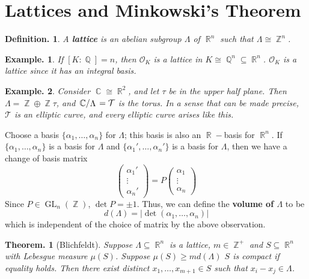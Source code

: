 \documentclass[11pt, a4paper]{memoir}
\DeclareMathOperator{\Q}{{\mathbb{Q}}}
\DeclareMathOperator{\Z}{{\mathbb{Z}}}
\DeclareMathOperator{\R}{{\mathbb{R}}}
\DeclareMathOperator{\C}{{\mathbb{C}}}
\theoremstyle{change}
\newtheorem{theorem}{Theorem.}[section]
\theoremstyle{plain}
\theoremstyle{nonumberplain}
\newtheorem{definition}{Definition.}
\newtheorem{example}{Example.}
\DeclareMathOperator{\GL}{GL}
\newcommand{\quot}[2]{\mathchoice{\left.\raisebox{0.13em}{$#1$}\middle/\raisebox{-0.13em}{$#2$}\right.}
                                 {\left.\raisebox{0.07em}{$#1$}\middle/\raisebox{-0.07em}{$#2$}\right.}
                                 {\left.\raisebox{0.03em}{$#1$}\middle/\raisebox{-0.03em}{$#2$}\right.}
                                 {\left.\raisebox{0em}{$#1$}\middle/\raisebox{0em}{$#2$}\right.}}
\newcommand{\mbf}[1]{{\boldmath\bfseries #1}}
\numberwithin{equation}{section}
\begin{document}
\section{Lattices and Minkowski's Theorem}
\begin{definition}
    A \mbf{lattice} is an abelian subgroup $\Lambda$ of $\R^n$ such that $\Lambda\cong\Z^n$.
\end{definition}
\begin{example}
    If $[K:\Q]=n$, then $\mathcal{O}_K$ is a lattice in $K\cong\Q^n\subseteq\R^n$.
    $\mathcal{O}_K$ is a lattice since it has an integral basis.
\end{example}
\begin{example}
    Consider $\C\cong\R^2$, and let $\tau$ be in the upper half plane.
    Then $\Lambda=\Z\oplus\Z\tau$, and $\quot{\C}{\Lambda}=\mathcal{T}$ is the torus.
    In a sense that can be made precise, $\mathcal{T}$ is an elliptic curve, and every elliptic curve arises like this.
\end{example}
Choose a basis $\{\alpha_1,\ldots,\alpha_n\}$ for $\Lambda$; this basis is also an $\R-$basis for $\R^n$.
If $\{\alpha_1,\ldots,\alpha_n\}$ is a basis for $\Lambda$ and $\{\alpha_1',\ldots,\alpha_n'\}$ is a basis for $\Lambda$, then we have a change of basis matrix
\begin{equation*}
    \begin{pmatrix}\alpha_1'\\\vdots\\\alpha_n'\end{pmatrix}=P\begin{pmatrix}\alpha_1\\\vdots\\\alpha_n\end{pmatrix}
\end{equation*}
Since $P\in\GL_n(\Z)$, $\det P=\pm 1$.
Thus, we can define the \mbf{volume of $\Lambda$} to be
\begin{equation*}
    d(\Lambda)=|\det(\alpha_1,\ldots,\alpha_n)|
\end{equation*}
which is independent of the choice of matrix by the above observation.
\begin{theorem}[Blichfeldt]\label{thm:blich}
    Suppose $\Lambda\subseteq\R^n$ is a lattice, $m\in\Z^+$ and $S\subseteq\R^n$ with Lebesgue measure $\mu(S)$.
    Suppose $\mu(S)\geq md(\Lambda)$ $S$ is compact if equality holds.
    Then there exist distinct $x_1,\ldots,x_{m+1}\in S$ such that $x_i-x_j\in\Lambda$.
\end{theorem}
\end{document}
